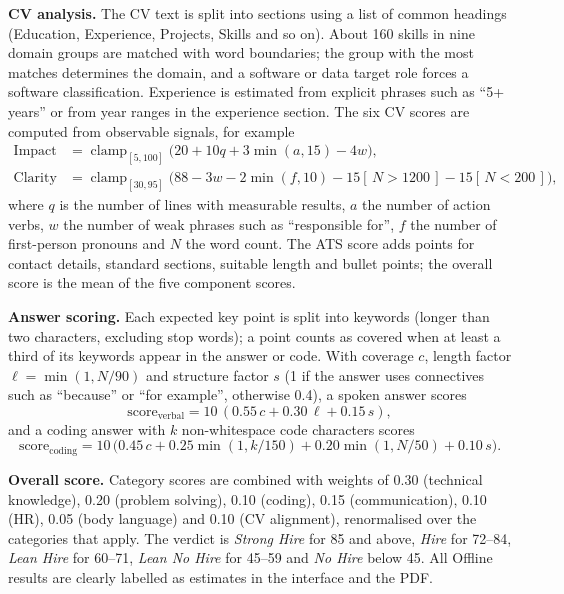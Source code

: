 \documentclass[12pt,a4paper,oneside]{report}
\begin{document}
\textbf{CV analysis.} The CV text is split into sections using a list of common headings (Education, Experience, Projects, Skills and so on). About 160 skills in nine domain groups are matched with word boundaries; the group with the most matches determines the domain, and a software or data target role forces a software classification. Experience is estimated from explicit phrases such as ``5+ years'' or from year ranges in the experience section. The six CV scores are computed from observable signals, for example
\begin{align}
\text{Impact} &= \operatorname{clamp}_{[5,100]}\bigl(20 + 10q + 3\min(a, 15) - 4w\bigr),\\
\text{Clarity} &= \operatorname{clamp}_{[30,95]}\bigl(88 - 3w - 2\min(f, 10) - 15[\,N > 1200\,] - 15[\,N < 200\,]\bigr),
\end{align}
where $q$ is the number of lines with measurable results, $a$ the number of action verbs, $w$ the number of weak phrases such as ``responsible for'', $f$ the number of first-person pronouns and $N$ the word count. The ATS score adds points for contact details, standard sections, suitable length and bullet points; the overall score is the mean of the five component scores.

\textbf{Answer scoring.} Each expected key point is split into keywords (longer than two characters, excluding stop words); a point counts as covered when at least a third of its keywords appear in the answer or code. With coverage $c$, length factor $\ell = \min(1, N/90)$ and structure factor $s$ (1 if the answer uses connectives such as ``because'' or ``for example'', otherwise 0.4), a spoken answer scores
\begin{equation}
\text{score}_{\text{verbal}} = 10\,(0.55\,c + 0.30\,\ell + 0.15\,s),
\end{equation}
and a coding answer with $k$ non-whitespace code characters scores
\begin{equation}
\text{score}_{\text{coding}} = 10\,\bigl(0.45\,c + 0.25\min(1, k/150) + 0.20\min(1, N/50) + 0.10\,s\bigr).
\end{equation}

\textbf{Overall score.} Category scores are combined with weights of 0.30 (technical knowledge), 0.20 (problem solving), 0.10 (coding), 0.15 (communication), 0.10 (HR), 0.05 (body language) and 0.10 (CV alignment), renormalised over the categories that apply. The verdict is \emph{Strong Hire} for 85 and above, \emph{Hire} for 72--84, \emph{Lean Hire} for 60--71, \emph{Lean No Hire} for 45--59 and \emph{No Hire} below 45. All Offline results are clearly labelled as estimates in the interface and the PDF.
\end{document}
